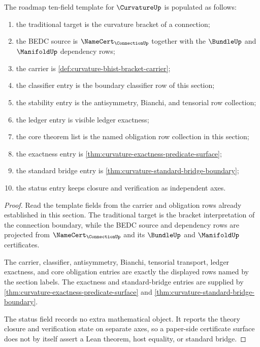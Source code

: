 \begin{theorem}
\label{thm:curvature-status-ten-field-record}
The roadmap ten-field template for $\CurvatureUp$ is populated as follows:
\begin{enumerate}
\item the traditional target is the curvature bracket of a connection;
\item the BEDC source is $\NameCert_{\ConnectionUp}$ together with the $\BundleUp$ and $\ManifoldUp$ dependency rows;
\item the carrier is \autoref{def:curvature-bhist-bracket-carrier};
\item the classifier entry is the boundary classifier row of this section;
\item the stability entry is the antisymmetry, Bianchi, and tensorial row collection;
\item the ledger entry is visible ledger exactness;
\item the core theorem list is the named obligation row collection in this section;
\item the exactness entry is \autoref{thm:curvature-exactness-predicate-surface};
\item the standard bridge entry is \autoref{thm:curvature-standard-bridge-boundary};
\item the status entry keeps closure and verification as independent axes.
\end{enumerate}
\end{theorem}
\begin{proof}
Read the template fields from the carrier and obligation rows already established in this section. The traditional target is the bracket interpretation of the connection boundary, while the BEDC source and dependency rows are projected from $\NameCert_{\ConnectionUp}$ and its $\BundleUp$ and $\ManifoldUp$ certificates.

The carrier, classifier, antisymmetry, Bianchi, tensorial transport, ledger exactness, and core obligation entries are exactly the displayed rows named by the section labels. The exactness and standard-bridge entries are supplied by \autoref{thm:curvature-exactness-predicate-surface} and \autoref{thm:curvature-standard-bridge-boundary}.

The status field records no extra mathematical object. It reports the theory closure and verification state on separate axes, so a paper-side certificate surface does not by itself assert a Lean theorem, host equality, or standard bridge.
\end{proof}

